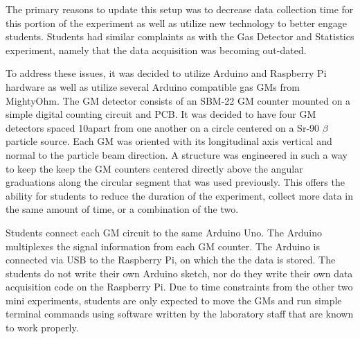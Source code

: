 The primary reasons to update this setup was to decrease data collection time for this portion of the experiment as well as utilize new technology to better engage students.
Students had similar complaints as with the Gas Detector and Statistics experiment, namely that the data acquisition was becoming out-dated.


To address these issues, it was decided to utilize Arduino and Raspberry Pi hardware as well as utilize several Arduino compatible gas GMs from MightyOhm.
The GM detector consists of an SBM-22 GM counter mounted on a simple digital counting circuit and PCB.
It was decided to have four GM detectors spaced 10\textdegree apart from one another on a circle centered on a Sr-90 $\beta$ particle source.
Each GM was oriented with its longitudinal axis vertical and normal to the particle beam direction.
A structure was engineered in such a way to keep the keep the GM counters centered directly above the angular graduations along the circular segment that was used previously.
This offers the ability for students to reduce the duration of the experiment, collect more data in the same amount of time, or a combination of the two.


Students connect each GM circuit to the same Arduino Uno.
The Arduino multiplexes the signal information from each GM counter.
The Arduino is connected via USB to the Raspberry Pi, on which the the data is stored.
The students do not write their own Arduino sketch, nor do they write their own data acquisition code on the Raspberry Pi.
Due to time constraints from the other two mini experiments, students are only expected to move the GMs and run simple terminal commands using software written by the laboratory staff that are known to work properly.

